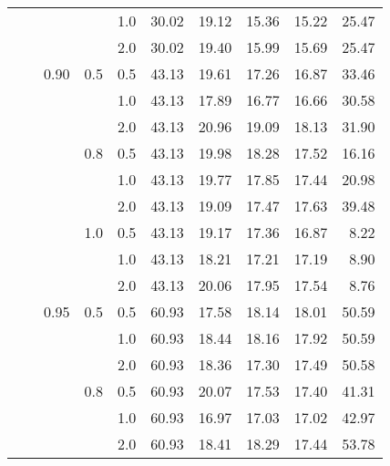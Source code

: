 \documentclass{article}
\begin{document}
{\begin{tabular}{lllllrrrrr}
            &     &      &     & 1.0 &   30.02 &   19.12 &             15.36 &                15.22 &      25.47 \\
            &     &      &     & 2.0 &   30.02 &   19.40 &             15.99 &                15.69 &      25.47 \\
            &     & 0.90 & 0.5 & 0.5 &   43.13 &   19.61 &             17.26 &                16.87 &      33.46 \\
            &     &      &     & 1.0 &   43.13 &   17.89 &             16.77 &                16.66 &      30.58 \\
            &     &      &     & 2.0 &   43.13 &   20.96 &             19.09 &                18.13 &      31.90 \\
            &     &      & 0.8 & 0.5 &   43.13 &   19.98 &             18.28 &                17.52 &      16.16 \\
            &     &      &     & 1.0 &   43.13 &   19.77 &             17.85 &                17.44 &      20.98 \\
            &     &      &     & 2.0 &   43.13 &   19.09 &             17.47 &                17.63 &      39.48 \\
            &     &      & 1.0 & 0.5 &   43.13 &   19.17 &             17.36 &                16.87 &       8.22 \\
            &     &      &     & 1.0 &   43.13 &   18.21 &             17.21 &                17.19 &       8.90 \\
            &     &      &     & 2.0 &   43.13 &   20.06 &             17.95 &                17.54 &       8.76 \\
            &     & 0.95 & 0.5 & 0.5 &   60.93 &   17.58 &             18.14 &                18.01 &      50.59 \\
            &     &      &     & 1.0 &   60.93 &   18.44 &             18.16 &                17.92 &      50.59 \\
            &     &      &     & 2.0 &   60.93 &   18.36 &             17.30 &                17.49 &      50.58 \\
            &     &      & 0.8 & 0.5 &   60.93 &   20.07 &             17.53 &                17.40 &      41.31 \\
            &     &      &     & 1.0 &   60.93 &   16.97 &             17.03 &                17.02 &      42.97 \\
            &     &      &     & 2.0 &   60.93 &   18.41 &             18.29 &                17.44 &      53.78 \\

\end{tabular}}
\end{document}
